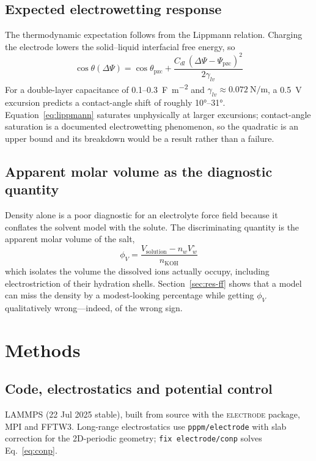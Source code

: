 \documentclass[11pt,a4paper]{article}
\begin{document}
\subsection{Expected electrowetting response}
The thermodynamic expectation follows from the Lippmann relation. Charging the electrode lowers the
solid--liquid interfacial free energy, so
\begin{equation}
\cos\theta(\Delta\Psi) = \cos\theta_{\mathrm{pzc}}
+ \frac{C_{dl}\,(\Delta\Psi - \Psi_{\mathrm{pzc}})^2}{2\gamma_{lv}}
\label{eq:lippmann}
\end{equation}
For a double-layer capacitance of 0.1--\SI{0.3}{\farad\per\square\metre} and
$\gamma_{lv}\approx\SI{0.072}{\newton\per\metre}$, a \SI{0.5}{\volt} excursion predicts a contact-angle
shift of roughly \ang{10}--\ang{31}. Equation~\eqref{eq:lippmann} saturates unphysically at larger
excursions; contact-angle saturation is a documented electrowetting phenomenon, so the quadratic is
an upper bound and its breakdown would be a result rather than a failure.

\subsection{Apparent molar volume as the diagnostic quantity}
Density alone is a poor diagnostic for an electrolyte force field because it conflates the solvent
model with the solute. The discriminating quantity is the apparent molar volume of the salt,
\begin{equation}
\phi_V = \frac{V_{\mathrm{solution}} - n_w V_w^{\circ}}{n_{\mathrm{KOH}}}
\label{eq:phiv}
\end{equation}
which isolates the volume the dissolved ions actually occupy, including electrostriction of their
hydration shells. Section~\ref{sec:res-ff} shows that a model can miss the density by a modest-looking
percentage while getting $\phi_V$ qualitatively wrong---indeed, of the wrong sign.

\section{Methods}\label{sec:methods}

\subsection{Code, electrostatics and potential control}
LAMMPS (22 Jul 2025 stable), built from source with the \textsc{electrode} package, MPI and FFTW3.
Long-range electrostatics use \texttt{pppm/electrode} with slab correction for the 2D-periodic
geometry; \texttt{fix electrode/conp} solves Eq.~\eqref{eq:conp}.
\end{document}
